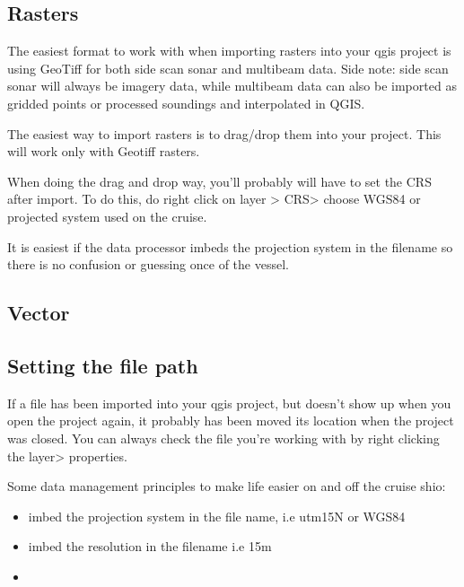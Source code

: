 \documentclass[letterpaper,10pt,english]{sphinxmanual}
\begin{document}
\subsection{Rasters}
\label{\detokenize{03_data_ingest:rasters}}
\sphinxAtStartPar
The easiest format to work with when importing rasters into your qgis project is using GeoTiff for both side scan sonar and multibeam data. Side note: side scan sonar will always be imagery data, while multibeam data can also be imported as gridded points or processed soundings and interpolated in QGIS.

\sphinxAtStartPar
The easiest way to import rasters is to drag/drop them into your project. This will work only with Geotiff rasters.

\sphinxAtStartPar
When doing the drag and drop way, you’ll probably will have to set the CRS after import. To do this, do right click on layer \sphinxhyphen{}\textgreater{} CRS\sphinxhyphen{}\textgreater{} choose WGS84 or projected system used on the cruise.

\sphinxAtStartPar
It is easiest if the data processor imbeds the projection system in the filename so there is no confusion or guessing once of the vessel.


\subsection{Vector}
\label{\detokenize{03_data_ingest:vector}}

\subsection{Setting the file path}
\label{\detokenize{03_data_ingest:setting-the-file-path}}
\sphinxAtStartPar
If a file has been imported into your qgis project, but doesn’t show up when you open the project again, it probably has been moved its location when the project was closed. You can always check the file you’re working with by right clicking the layer\sphinxhyphen{}\textgreater{} properties.

\sphinxAtStartPar
Some data management principles to make life easier on and off the cruise shio:
\begin{itemize}
\item {} 
\sphinxAtStartPar
imbed the projection system in the file name, i.e utm15N or WGS84

\item {} 
\sphinxAtStartPar
imbed the resolution in the filename i.e 15m

\item {} 
\end{itemize}
\end{document}
